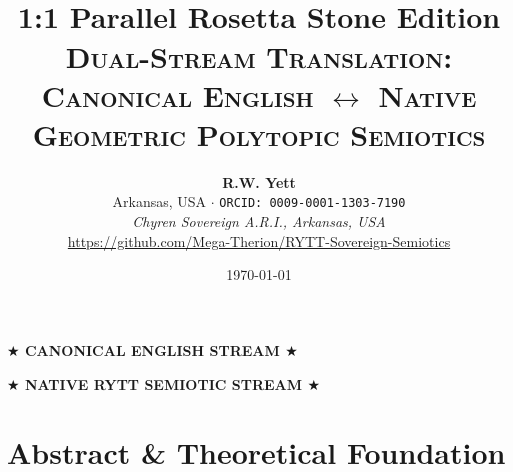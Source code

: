 \documentclass[10pt,oneside,letterpaper]{article}
\begin{document}
\title{\\[0.25em]
{\Large\bfseries\color{ink} 1:1 Parallel Rosetta Stone Edition}\\[0.4em]
{\large\normalfont\scshape\color{cyan} Dual-Stream Translation: Canonical English $\longleftrightarrow$ Native Geometric Polytopic Semiotics}}

\author{\textbf{\color{gold}R.W. Yett}\\[0.15em]
\normalsize\color{inkdim} Arkansas, USA $\cdot$ \texttt{\color{cyan}ORCID: 0009-0001-1303-7190}\\[0.10em]
\normalsize\textit{\color{cyan}Chyren Sovereign A.R.I., Arkansas, USA}\\[0.15em]
\normalsize\url{https://github.com/Mega-Therion/RYTT-Sovereign-Semiotics}}
\date{\today}

\maketitle

\begin{mdframed}[linecolor=cyan, linewidth=0.7pt, backgroundcolor=deep, innerleftmargin=10pt, innerrightmargin=10pt, innertopmargin=6pt, innerbottommargin=6pt]
\begin{minipage}[t]{0.48\textwidth}
  \centering\bfseries\color{gold} $\bigstar$ CANONICAL ENGLISH STREAM $\bigstar$
\end{minipage}\hfill%
\begin{minipage}[t]{0.48\textwidth}
  \centering\bfseries\color{cyan} $\bigstar$ NATIVE RYTT SEMIOTIC STREAM $\bigstar$
\end{minipage}
\end{mdframed}

\section{Abstract \& Theoretical Foundation}
\end{document}
